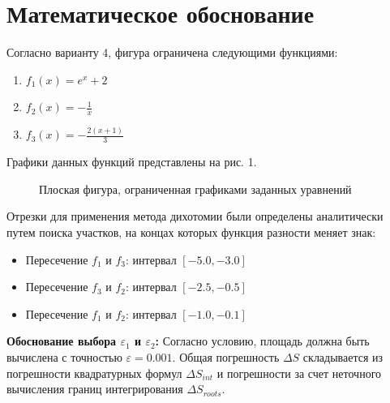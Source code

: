 \documentclass[a4paper,12pt,titlepage,final]{article}
\begin{document}
\newpage

\section{Математическое обоснование}
Согласно варианту 4, фигура ограничена следующими функциями:
\begin{enumerate}
\item \( f_1(x) = e^x + 2 \)
\item \( f_2(x) = -\frac{1}{x} \)
\item \( f_3(x) = -\frac{2(x + 1)}{3} \)
\end{enumerate}

Графики данных функций представлены на рис. 1.

\begin{figure}[h]
\centering
{}
\caption{Плоская фигура, ограниченная графиками заданных уравнений}
\end{figure}

Отрезки для применения метода дихотомии были определены аналитически путем поиска участков,
на концах которых функция разности меняет знак:

\begin{itemize}
\item Пересечение \( f_1 \) и \( f_3 \): интервал \( [-5.0, -3.0] \)
\item Пересечение \( f_3 \) и \( f_2 \): интервал \( [-2.5, -0.5] \)
\item Пересечение \( f_1 \) и \( f_2 \): интервал \( [-1.0, -0.1] \)
\end{itemize}

\textbf{Обоснование выбора $\varepsilon_1$ и $\varepsilon_2$:}
Согласно условию, площадь должна быть вычислена с точностью $\varepsilon = 0.001$.
Общая погрешность $\Delta S$ складывается из погрешности квадратурных формул $\Delta S_{int}$
и погрешности за счет неточного вычисления границ интегрирования $\Delta S_{roots}$.
\end{document}
